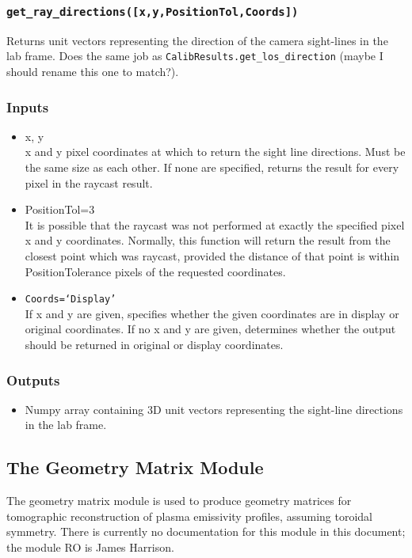 \documentclass[12pt]{article}
\newcommand{\code}[1]{\texttt{#1}}
\begin{document}
\subsubsection*{\code{get\_ray\_directions([x,y,PositionTol,Coords])}}
\begin{adjustwidth}{0.5cm}{0cm}
Returns unit vectors representing the direction of the camera sight-lines in the lab frame. Does the same job as \code{CalibResults.get\_los\_direction} (maybe I should rename this one to match?).
\subsubsection*{Inputs}
\begin{itemize}
\item{x, y\\x and y pixel coordinates at which to return the sight line directions. Must be the same size as each other. If none are specified, returns the result for every pixel in the raycast result.}
\item{PositionTol=3\\It is possible that the raycast was not performed at exactly the specified pixel x and y coordinates. Normally, this function will return the result from the closest point which was raycast, provided the distance of that point is within PositionTolerance pixels of the requested coordinates.}
\item{\code{Coords=`Display'}\\ If x and y are given, specifies whether the given coordinates are in display or original coordinates. If no x and y are given, determines whether the output should be returned in original or display coordinates.}
\end{itemize}
\end{adjustwidth}
\subsubsection*{Outputs}
\begin{itemize}
\item{Numpy array containing 3D unit vectors representing the sight-line directions in the lab frame.}
\end{itemize}
\subsection{The Geometry Matrix Module}
The geometry matrix module is used to produce geometry matrices for tomographic reconstruction of plasma emissivity profiles, assuming toroidal symmetry. There is currently no documentation for this module in this document; the module RO is James Harrison.
\end{document}

